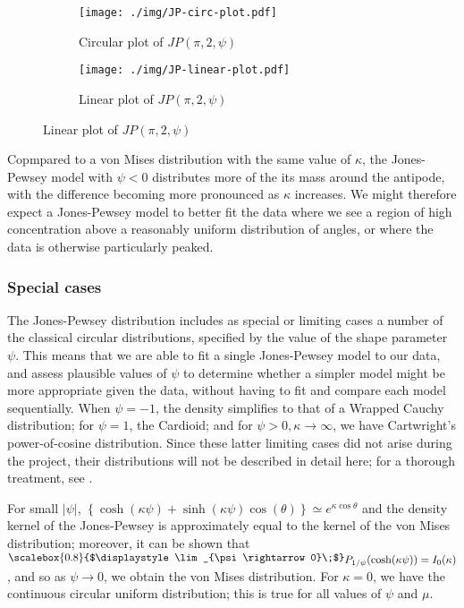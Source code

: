 \documentclass[../../ArchStats.tex]{subfiles}
\newcommand{\Lim}[1]{\raisebox{0.5ex}{\scalebox{0.8}{$\displaystyle \lim_{#1}\;$}}}
\begin{document}
\begin{figure}[!h]
\centering
\caption{Jones-Pewsey densities with $\mu = \pi$, $\kappa = 2$, and varying $\psi$}
\label{fig:JP-densities}
%
\begin{subfigure}[t]{0.4\textwidth}
\centering
\caption{Circular plot of $JP(\pi, 2, \psi)$}
\texttt{[image: ./img/JP-circ-plot.pdf]}
\end{subfigure}
%
\begin{subfigure}[t]{0.4\textwidth}
\centering
\caption{Linear plot of $JP(\pi, 2, \psi)$}
\texttt{[image: ./img/JP-linear-plot.pdf]}
\end{subfigure}
%
\end{figure}

Copmpared to a von Mises distribution with the same value of $\kappa$, the Jones-Pewsey model with $\psi < 0$ distributes more of the its mass around the antipode, with the difference becoming more pronounced as $\kappa$ increases. We might therefore expect a Jones-Pewsey model to better fit the data where we see a region of high concentration above a reasonably uniform distribution of angles, or where the data is otherwise particularly peaked.

\subsubsection{Special cases}

The Jones-Pewsey distribution includes as special or limiting cases a number of the classical circular distributions, specified by the value of the shape parameter $\psi$. This means that we are able to fit a single Jones-Pewsey model to our data, and assess plausible values of $\psi$ to determine whether a simpler model might be more appropriate given the data, without having to fit and compare each model sequentially. When $\psi = -1$, the density simplifies to that of a Wrapped Cauchy distribution; for $\psi = 1$, the Cardioid; and for $\psi > 0, \kappa \rightarrow \infty$, we have Cartwright's power-of-cosine distribution. Since these latter limiting cases did not arise during the project, their distributions will  not be described in detail here; for a thorough treatment, see \cite{Jones2005}. 

For small $\vert \psi \vert$, $\left\lbrace \cosh(\kappa\psi) + \sinh(\kappa\psi) \cos(\theta) \right\rbrace \simeq e^{\kappa \cos \theta}$ and the density kernel of the Jones-Pewsey is approximately equal to the kernel of the von Mises distribution; moreover, it can be shown that $\Lim{\psi \rightarrow 0} P_{1/\psi}(\cosh(\kappa\psi)) = I_0(\kappa)$, and so as $\psi \rightarrow 0$, we obtain the von Mises distribution. For $\kappa = 0$, we have the continuous circular uniform distribution; this is true for all values of $\psi$ and $\mu$.
\end{document}
